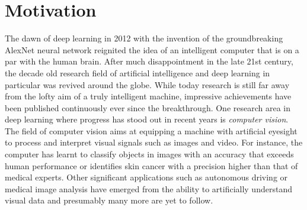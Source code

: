 \documentclass[12pt,a4paper]{article}
\begin{document}


\newpage
\tableofcontents
\newpage
\listoffigures
\newpage
\listoftables
\newpage

\section{Motivation}
The dawn of deep learning in 2012 with the invention of the groundbreaking AlexNet neural network reignited the idea of an intelligent computer that is on a par with the human brain. After much disappointment in the late 21st century, the decade old research field of artificial intelligence and deep learning in particular was revived around the globe. While today research is still far away from the lofty aim of a truly intelligent machine, impressive achievements have been published continuously ever since the breakthrough. One research area in deep learning where progress has stood out in recent years is \textit{computer vision}. The field of computer vision aims at equipping a machine with artificial eyesight to process and interpret visual signals such as images and video. For instance, the computer has learnt to classify objects in images with an accuracy that exceeds human performance or identifies skin cancer with a precision higher than that of medical experts. Other significant applications such as autonomous driving or medical image analysis have emerged from the ability to artificially understand visual data and presumably many more are yet to follow. 
\end{document}
